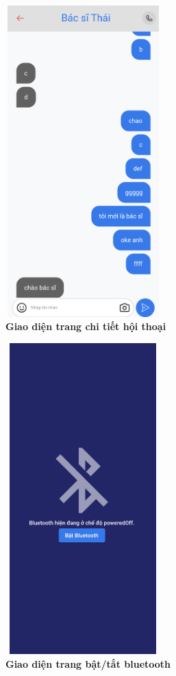 \begin{figure}[H]
  \centering
  \includegraphics[width=6cm,height=12cm]{Images/mobile_app/demo/chat_detail.png}
  \caption[Giao diện trang chi tiết hội thoại]{\bfseries \fontsize{12pt}{0pt}\selectfont Giao diện trang chi tiết hội thoại}
  \label{demo_} %
\end{figure}

\begin{figure}[H]
  \centering
  \includegraphics[width=6cm,height=12cm]{Images/mobile_app/demo/off_bluetooth.png}
  \caption[Giao diện trang bật/tắt bluetooth]{\bfseries \fontsize{12pt}{0pt}\selectfont Giao diện trang bật/tắt bluetooth}
  \label{demo_} %
\end{figure}

